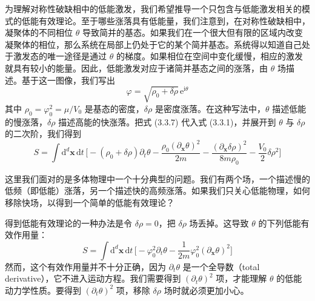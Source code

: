 为理解对称性破缺相中的低能激发，我们希望推导一个只包含与低能激发相关的模式的低能有效理论。至于哪些涨落具有低能量，我们注意到，在对称性破缺相中，凝聚体的不同相位 $\theta$ 导致简并的基态。如果我们在一个很大但有限的区域内改变凝聚体的相位，那么系统在局部上仍处于它的某个简并基态。系统得以知道自己处于激发态的唯一途径是通过 $\theta$ 的梯度。如果相位在空间中变化缓慢，相应的激发就具有较小的能量。因此，低能激发对应于诸简并基态之间的涨落，由 $\theta$ 场描述。基于这一图像，我们写出
\begin{equation*}
\varphi = \sqrt{\rho_0 + \delta\rho}\,\mathrm{e}^{\mathrm{i}\theta}\tag{3.3.7}
\end{equation*}
其中 $\rho_0 = \varphi_0^2 = \mu/V_0$ 是基态的密度，$\delta\rho$ 是密度涨落。在这种写法中，$\theta$ 描述低能的慢涨落，$\delta\rho$ 描述高能的快涨落。把式 (3.3.7) 代入式 (3.3.1)，并展开到 $\theta$ 与 $\delta\rho$ 的二次阶，我们得到
\begin{equation*}
S = \int \mathrm{d}^d\pmb{x}\,\mathrm{d}t\,\Big[-(\rho_0+\delta\rho)\partial_t\theta - \frac{\rho_0(\partial_{\pmb{x}}\theta)^2}{2m} - \frac{(\partial_{\pmb{x}}\delta\rho)^2}{8m\rho_0} - \frac{V_0}{2}\delta\rho^2\Big]\tag{3.3.8}
\end{equation*}

这里我们面对的是多体物理中一个十分典型的问题。我们有两个场，一个描述慢的低频（即低能）涨落，另一个描述快的高频涨落。如果我们只关心低能物理，如何移除快场，以得到一个简单的低能有效理论？

得到低能有效理论的一种办法是令 $\delta\rho = 0$，把 $\delta\rho$ 场丢掉。这导致 $\theta$ 的下列低能有效作用量：
\begin{equation*}
S = \int \mathrm{d}^d\pmb{x}\,\mathrm{d}t\,\Big[-\varphi_0^2\partial_t\theta - \frac{1}{2m}\varphi_0^2(\partial_{\pmb{x}}\theta)^2\Big]
\end{equation*}
然而，这个有效作用量并不十分正确，因为 $\partial_t\theta$ 是一个全导数（total derivative），它不进入运动方程。我们需要得到 $(\partial_t\theta)^2$ 项，才能理解 $\theta$ 的低能动力学性质。要得到 $(\partial_t\theta)^2$ 项，移除 $\delta\rho$ 场时就必须更加小心。

